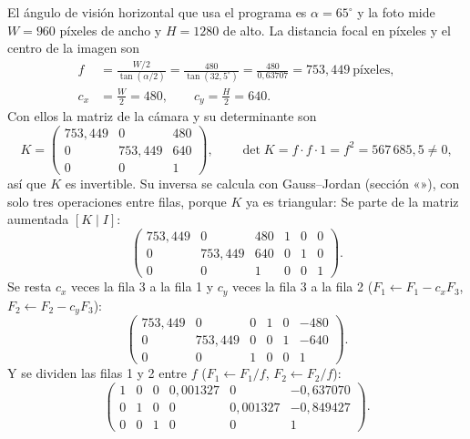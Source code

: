 El ángulo de visión horizontal que usa el programa es $\alpha=65^\circ$ y la foto mide $W=960$ píxeles de ancho
y $H=1280$ de alto. La distancia focal en píxeles y el centro de la imagen son
\begin{align*}
f &= \frac{W/2}{\tan(\alpha/2)}=\frac{480}{\tan(32{,}5^\circ)}=\frac{480}{0{,}63707}=753{,}449\ \text{píxeles},\\
c_x&=\frac{W}{2}=480,\qquad c_y=\frac{H}{2}=640 .
\end{align*}
Con ellos la matriz de la cámara y su determinante son
\begin{equation}
K=\begin{pmatrix} 753{,}449 & 0 & 480 \\ 0 & 753{,}449 & 640 \\ 0 & 0 & 1 \end{pmatrix},\qquad \det K=f\cdot f\cdot1=f^2=567\,685{,}5\neq0,
\end{equation}
así que $K$ es invertible. Su inversa se calcula con Gauss--Jordan (sección «»), con solo tres
operaciones entre filas, porque $K$ ya es triangular:
Se parte de la matriz aumentada $[K\mid I]$:
\begin{equation*}
\left(\begin{array}{ccc|ccc} 753{,}449 & 0 & 480 & 1 & 0 & 0\\ 0 & 753{,}449 & 640 & 0 & 1 & 0\\ 0&0&1&0&0&1\end{array}\right).
\end{equation*}
Se resta $c_x$ veces la fila 3 a la fila 1 y $c_y$ veces la fila 3 a la fila 2 ($F_1\leftarrow F_1-c_xF_3$, $F_2\leftarrow F_2-c_yF_3$):
\begin{equation*}
\left(\begin{array}{ccc|ccc} 753{,}449 & 0 & 0 & 1 & 0 & -480\\ 0 & 753{,}449 & 0 & 0 & 1 & -640\\ 0&0&1&0&0&1\end{array}\right).
\end{equation*}
Y se dividen las filas 1 y 2 entre $f$ ($F_1\leftarrow F_1/f$, $F_2\leftarrow F_2/f$):
\begin{equation*}
\left(\begin{array}{ccc|ccc} 1&0&0& 0{,}001327 & 0 & -0{,}637070\\ 0&1&0& 0 & 0{,}001327 & -0{,}849427\\ 0&0&1&0&0&1\end{array}\right).
\end{equation*}
